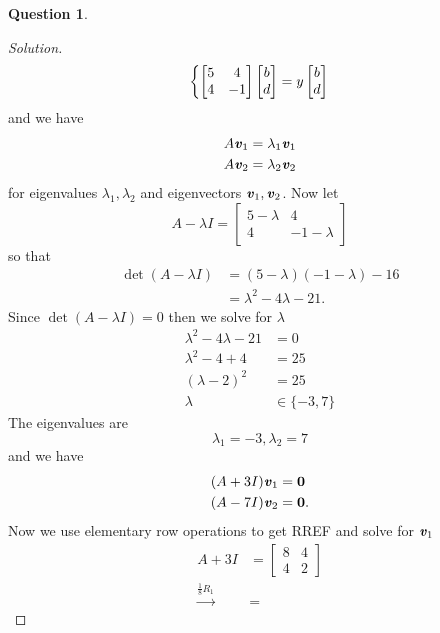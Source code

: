 \documentclass{article}
\theoremstyle{definition}
\newtheorem{question}{Question}
\newcommand{\vt}[1]{\textbf{\textit{#1}}}
\newcommand{\0}{\textbf{0}}
\begin{document}
\begin{question}
\begin{proof}[Solution]
\[\begin{dcases}
        \begin{bmatrix}
            5 & 4 \\
            4 & -1
        \end{bmatrix}
        \begin{bmatrix}
            b \\ d
        \end{bmatrix} = y
        \begin{bmatrix}
            b \\ d
        \end{bmatrix}
    \end{dcases}\] and we have
    \begin{align*}
        A\vt{v}_1 &= \lambda_1\vt{v}_1 \\
        A\vt{v}_2 &= \lambda_2\vt{v}_2
    \end{align*}
    for eigenvalues \(\lambda_1, \lambda_2\) and eigenvectors \(\vt{v}_1, \vt{v}_2\).
    Now let
    \[A-\lambda I=\begin{bmatrix}
        5-\lambda & 4 \\
        4 & -1-\lambda
    \end{bmatrix}\]
    so that
    \begin{align*}
        \det(A-\lambda I) &= (5-\lambda)(-1-\lambda)-16 \\
        &= \lambda^2-4\lambda-21.
    \end{align*}
    Since \(\det(A-\lambda I)=0\) then we solve for \(\lambda\)
    \begin{align*}
        \lambda^2-4\lambda-21 &= 0 \\
        \lambda^2-4+4 &= 25 \\
        (\lambda-2)^2 &= 25 \\
        \lambda &\in \{-3, 7\}
    \end{align*}
    The eigenvalues are \[\lambda_1=-3, \lambda_2=7\] and we have
    \begin{align*}
        (A+3I)\vt{v}_1 &= \0 \\
        (A-7I)\vt{v}_2 &= \0.
    \end{align*}
    Now we use elementary row operations to get RREF and solve for \(\vt{v}_1\)
    \begin{align*}
        A+3I &=
        \begin{bmatrix}
            8 & 4 \\
            4 & 2
        \end{bmatrix} \\
        \xrightarrow{\frac{1}{8}R_1} &=

\end{align*}
\end{proof}
\end{question}
\end{document}
